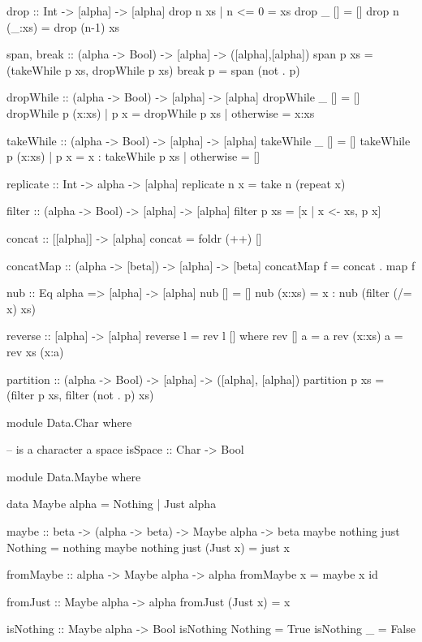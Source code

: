 \begin{code}
drop :: Int -> [alpha] -> [alpha]
drop n xs | n <= 0  =  xs
drop _ []           =  []
drop n (_:xs)       =  drop (n-1) xs

span, break :: (alpha -> Bool) -> [alpha] -> ([alpha],[alpha])
span p xs = (takeWhile p xs, dropWhile p xs)
break p =  span (not . p)

dropWhile :: (alpha -> Bool) -> [alpha] -> [alpha]
dropWhile _ []           = []
dropWhile p (x:xs)
            | p x        = dropWhile p xs
            | otherwise  = x:xs

takeWhile :: (alpha -> Bool) -> [alpha] -> [alpha]
takeWhile _ []           =  []
takeWhile p (x:xs) 
            | p x        =  x : takeWhile p xs
            | otherwise  =  []

replicate :: Int -> alpha -> [alpha]
replicate n x =  take n (repeat x)

filter :: (alpha -> Bool) -> [alpha] -> [alpha]
filter p xs = [x | x <- xs, p x]

concat :: [[alpha]] -> [alpha]
concat = foldr (++) []

concatMap :: (alpha -> [beta]) -> [alpha] -> [beta]
concatMap f =  concat . map f

nub :: Eq alpha => [alpha] -> [alpha]
nub []      =  []
nub (x:xs)  =  x : nub (filter (/= x) xs)

reverse :: [alpha] -> [alpha]
reverse l =  rev l []
  where  rev []     a = a
         rev (x:xs) a = rev xs (x:a)
         
partition :: (alpha -> Bool) -> [alpha] -> ([alpha], [alpha])
partition p xs = (filter p xs, filter (not . p) xs)
\end{code}

\begin{code}
module Data.Char where

-- is a character a space
isSpace :: Char -> Bool
\end{code}


\begin{code}
module Data.Maybe where

data Maybe alpha = Nothing | Just alpha

maybe :: beta -> (alpha -> beta) -> Maybe alpha -> beta
maybe nothing just Nothing   = nothing
maybe nothing just (Just x)  = just x

fromMaybe :: alpha -> Maybe alpha -> alpha
fromMaybe x = maybe x id

fromJust          :: Maybe alpha -> alpha
fromJust (Just x) = x

isNothing         :: Maybe alpha -> Bool
isNothing Nothing = True
isNothing _       = False
\end{code}

